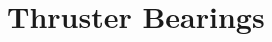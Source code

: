 \documentclass[../main.tex]{subfiles}
\begin{document}
\section{Thruster Bearings} \label{thrusterBearings}
\end{document}
